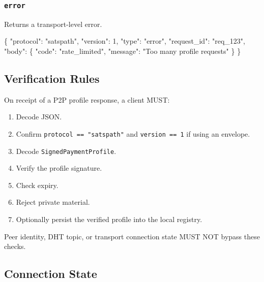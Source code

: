 \documentclass[
]{article}
\newenvironment{Shaded}{}{}
\newcommand{\DataTypeTok}[1]{\textcolor[rgb]{0.56,0.13,0.00}{#1}}
\newcommand{\DecValTok}[1]{\textcolor[rgb]{0.25,0.63,0.44}{#1}}
\newcommand{\FunctionTok}[1]{\textcolor[rgb]{0.02,0.16,0.49}{#1}}
\newcommand{\StringTok}[1]{\textcolor[rgb]{0.25,0.44,0.63}{#1}}
\providecommand{\tightlist}{%
  \setlength{\itemsep}{0pt}\setlength{\parskip}{0pt}}
\begin{document}
\hypertarget{error}{%
\subsubsection{\texorpdfstring{\texttt{error}}{error}}\label{error}}

Returns a transport-level error.

\begin{Shaded}
\begin{Highlighting}[]
\FunctionTok{\{}
  \DataTypeTok{"protocol"}\FunctionTok{:} \StringTok{"satspath"}\FunctionTok{,}
  \DataTypeTok{"version"}\FunctionTok{:} \DecValTok{1}\FunctionTok{,}
  \DataTypeTok{"type"}\FunctionTok{:} \StringTok{"error"}\FunctionTok{,}
  \DataTypeTok{"request\_id"}\FunctionTok{:} \StringTok{"req\_123"}\FunctionTok{,}
  \DataTypeTok{"body"}\FunctionTok{:} \FunctionTok{\{}
    \DataTypeTok{"code"}\FunctionTok{:} \StringTok{"rate\_limited"}\FunctionTok{,}
    \DataTypeTok{"message"}\FunctionTok{:} \StringTok{"Too many profile requests"}
  \FunctionTok{\}}
\FunctionTok{\}}
\end{Highlighting}
\end{Shaded}

\hypertarget{verification-rules}{%
\subsection{Verification Rules}\label{verification-rules}}

On receipt of a P2P profile response, a client MUST:

\begin{enumerate}
\def\labelenumi{\arabic{enumi}.}
\tightlist
\item
  Decode JSON.
\item
  Confirm \texttt{protocol\ ==\ "satspath"} and \texttt{version\ ==\ 1}
  if using an envelope.
\item
  Decode \texttt{SignedPaymentProfile}.
\item
  Verify the profile signature.
\item
  Check expiry.
\item
  Reject private material.
\item
  Optionally persist the verified profile into the local registry.
\end{enumerate}

Peer identity, DHT topic, or transport connection state MUST NOT bypass
these checks.

\hypertarget{connection-state}{%
\subsection{Connection State}\label{connection-state}}
\end{document}

